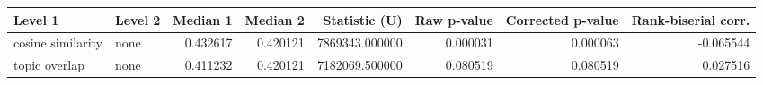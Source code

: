 \begin{tabular}{llrrrrrr}
\toprule
Level 1 & Level 2 & Median 1 & Median 2 & Statistic (U) & Raw p-value & Corrected p-value & Rank-biserial corr. \\
\midrule
cosine similarity & none & 0.432617 & 0.420121 & 7869343.000000 & 0.000031 & 0.000063 & -0.065544 \\
topic overlap & none & 0.411232 & 0.420121 & 7182069.500000 & 0.080519 & 0.080519 & 0.027516 \\
\bottomrule
\end{tabular}
